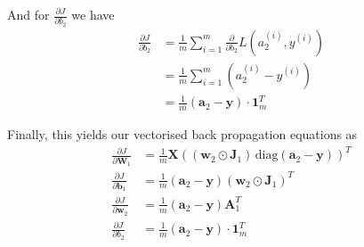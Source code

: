 \documentclass[varwidth,border=2cm]{standalone}
\newcommand{\pd}[2]{\frac{\partial #1}{\partial #2}}
\begin{document}
And for $\pd{J}{b_2}$ we have
\begin{align}
\pd{J}{b_2} &= \frac{1}{m} \displaystyle \sum _{i=1}^m \pd{}{b_2}L(a_{2}^{(i)}, y^{(i)}) \\
 &= \frac{1}{m} \displaystyle \sum _{i=1}^m (a_2^{(i)} - y^{(i)}) \nonumber \\
 &= \frac{1}{m} (\bm a_2 - \bm y)\cdot\bm 1_m^T \nonumber
\end{align}

Finally, this yields our vectorised back propagation equations as
\begin{align}
\pd{J}{\bm W_1} &= \frac{1}{m} \bm X \left( (\bm w_2 \odot \bm J_1) \, \mathrm{diag}(\bm a_2 - \bm y) \right)^T \\
\pd{J}{\bm b_1} &= \frac{1}{m} (\bm a_2 - \bm y)(\bm w_2 \odot \bm J_1)^T \nonumber \\
\pd{J}{\bm w_2} &= \frac{1}{m} (\bm a_2 - \bm y)\bm A_1^T \nonumber \\
\pd{J}{b_2}     &= \frac{1}{m} (\bm a_2 - \bm y)\cdot\bm 1_m^T \nonumber
\end{align}
\end{document}
